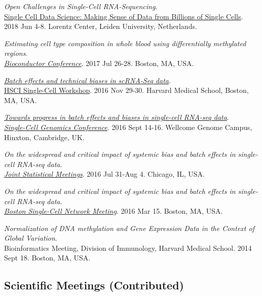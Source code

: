 \documentclass[10pt]{article}
\begin{document}
{\it Open Challenges in Single-Cell RNA-Sequencing}. \\ 
\href{http://lorentzcenter.nl/lc/web/2018/986/info.php3?wsid=986&venue=Oort}{Single Cell Data Science: Making Sense of Data from Billions of Single Cells}. 2018 Jun 4-8. Lorentz Center, Leiden University, Netherlands.
\item 
{\it Estimating cell type composition in whole blood using differentially methylated regions}. \\
\href{http://bioconductor.org/help/course-materials/2017/BioC2017/}{{\it Bioconductor Conference}}. 2017 Jul 26-28. Boston, MA, USA.
\item 
{\it \href{https://github.com/hms-dbmi/scw/tree/master/scw2016/tutorials/batcheffects}{Batch effects and technical biases in scRNA-Seq data}}. \\ 
\href{http://hsci.harvard.edu/event/save-date-single-cell-analysis-workshop}{HSCI Single-Cell Workshop}. 2016 Nov 29-30. Harvard Medical School, Boston, MA, USA.
\item
{\it \href{https://speakerdeck.com/stephaniehicks/towards-progress-in-batch-effects-and-biases-in-single-cell-rna-seq-data}{Towards progress in batch effects and biases in single-cell RNA-seq data}}. \\
\href{https://coursesandconferences.wellcomegenomecampus.org/events/item.aspx?e=596}{{\it Single-Cell Genomics Conference}}. 2016 Sept 14-16. Wellcome Genome Campus, Hinxton, Cambridge, UK.
\item
{\it On the widespread and critical impact of systemic bias and batch effects in single-cell RNA-seq data}. \\
\href{https://www.amstat.org/meetings/jsm/2016/onlineprogram/MainSearchResults.cfm}{{\it Joint Statistical Meetings}}. 2016 Jul 31-Aug 4. Chicago, IL, USA.
\item
{\it On the widespread and critical impact of systemic bias and batch effects in single-cell RNA-seq data}. \\
\href{http://hsci.harvard.edu/event/widespread-and-critical-impact-systemic-bias-and-batch-effects-single-cell-rna-seq-data?delta=0}{{\it Boston Single-Cell Network Meeting}}. 2016 Mar 15. Boston, MA, USA.
\item 
{\it Normalization of DNA methylation and Gene Expression Data in the Context of Global Variation}. \\
Bioinformatics Meeting, Division of Immunology, Harvard Medical School. 2014 Sept 18. Boston, MA, USA.


\subsection*{Scientific Meetings (Contributed)}
\end{document}
